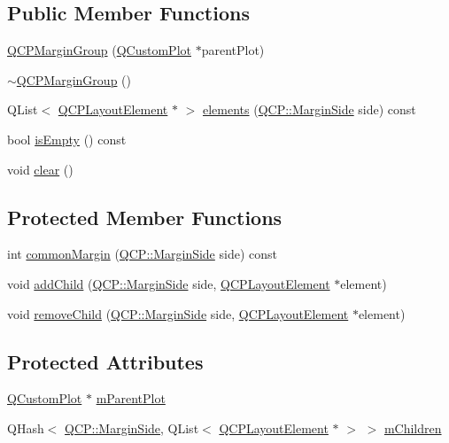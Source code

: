 \subsection*{Public Member Functions}
\begin{DoxyCompactItemize}
\item 
\hyperlink{classQCPMarginGroup_ac481c20678ec5b305d6df330715f4b7b}{Q\+C\+P\+Margin\+Group} (\hyperlink{classQCustomPlot}{Q\+Custom\+Plot} $\ast$parent\+Plot)
\item 
\hyperlink{classQCPMarginGroup_a42c62becdaac41406ca90f1c2a755e1c}{$\sim$\+Q\+C\+P\+Margin\+Group} ()
\item 
Q\+List$<$ \hyperlink{classQCPLayoutElement}{Q\+C\+P\+Layout\+Element} $\ast$ $>$ \hyperlink{classQCPMarginGroup_a2f39e319c9ece34e0392c2ca350f1069}{elements} (\hyperlink{namespaceQCP_a7e487e3e2ccb62ab7771065bab7cae54}{Q\+C\+P\+::\+Margin\+Side} side) const 
\item 
bool \hyperlink{classQCPMarginGroup_a28c8e87a0b87c01bd28c693faabddd7b}{is\+Empty} () const 
\item 
void \hyperlink{classQCPMarginGroup_a144b67f216e4e86c3a3a309e850285fe}{clear} ()
\end{DoxyCompactItemize}
\subsection*{Protected Member Functions}
\begin{DoxyCompactItemize}
\item 
int \hyperlink{classQCPMarginGroup_aeaeba9068dba2ef8be41449f0f2582f7}{common\+Margin} (\hyperlink{namespaceQCP_a7e487e3e2ccb62ab7771065bab7cae54}{Q\+C\+P\+::\+Margin\+Side} side) const 
\item 
void \hyperlink{classQCPMarginGroup_acb9c3a35acec655c2895b7eb95ee0524}{add\+Child} (\hyperlink{namespaceQCP_a7e487e3e2ccb62ab7771065bab7cae54}{Q\+C\+P\+::\+Margin\+Side} side, \hyperlink{classQCPLayoutElement}{Q\+C\+P\+Layout\+Element} $\ast$element)
\item 
void \hyperlink{classQCPMarginGroup_a20ab3286062957d99b58db683fe725b0}{remove\+Child} (\hyperlink{namespaceQCP_a7e487e3e2ccb62ab7771065bab7cae54}{Q\+C\+P\+::\+Margin\+Side} side, \hyperlink{classQCPLayoutElement}{Q\+C\+P\+Layout\+Element} $\ast$element)
\end{DoxyCompactItemize}
\subsection*{Protected Attributes}
\begin{DoxyCompactItemize}
\item 
\hyperlink{classQCustomPlot}{Q\+Custom\+Plot} $\ast$ \hyperlink{classQCPMarginGroup_a23cfa29e3cc0f33a59141b77d8c04edf}{m\+Parent\+Plot}
\item 
Q\+Hash$<$ \hyperlink{namespaceQCP_a7e487e3e2ccb62ab7771065bab7cae54}{Q\+C\+P\+::\+Margin\+Side}, Q\+List$<$ \hyperlink{classQCPLayoutElement}{Q\+C\+P\+Layout\+Element} $\ast$ $>$ $>$ \hyperlink{classQCPMarginGroup_a954bc89ff8958b9bb6a4a0d08ed5fc0f}{m\+Children}
\end{DoxyCompactItemize}
